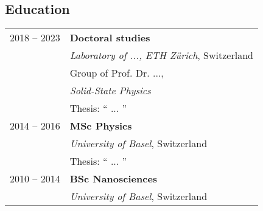 \subsection*{Education}
\begin{tabular}{rl}
	
	2018 -- 2023 & \textbf{Doctoral studies} \\
                 &\textit{Laboratory of ...,  ETH Z\"urich}, Switzerland \\
                 & Group of Prof. Dr. ...,\\
                 &\textit{Solid-State Physics}\\
                 &Thesis: `` ... ''\\

	
	
	
	2014 -- 2016 &\textbf{MSc Physics}\\
                 &\textit{University of Basel}, Switzerland \\
                 &Thesis: `` ... '' \\
	
	
	2010 -- 2014 &\textbf{BSc Nanosciences}\\
                 &\textit{University of Basel}, Switzerland \\
	
	
	
	
\end{tabular}


